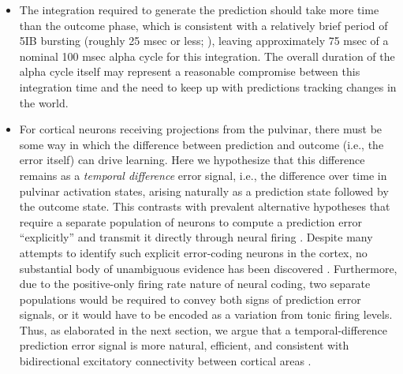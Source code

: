 \documentclass[11pt,twoside]{article}
\newif\myifpdf
\begin{document}
\begin{itemize}
		\item The integration required to generate the prediction should take more time than the outcome phase, which is consistent with a relatively brief period of 5IB bursting (roughly 25 msec or less; \citealp{ConnorsGutnickPrince82}), leaving approximately 75 msec of a nominal 100 msec alpha cycle for this integration.  The overall duration of the alpha cycle itself may represent a reasonable compromise between this integration time and the need to keep up with predictions tracking changes in the world.

	\item For cortical neurons receiving projections from the pulvinar, there must be some way in which the difference between prediction and outcome (i.e., the error itself) can drive learning.  Here we hypothesize that this difference remains as a \emph{temporal difference} error signal, i.e., the difference over time in pulvinar activation states, arising naturally as a prediction state followed by the outcome state.  This contrasts with prevalent alternative hypotheses that require a separate population of neurons to compute a prediction error ``explicitly'' and transmit it directly through neural firing \citep{RaoBallard99,KawatoHayakawaInui93,Friston05,Friston10,OudenKokLange12,LotterKreimanCox16}.  Despite many attempts to identify such explicit error-coding neurons in the cortex, no substantial body of unambiguous evidence has been discovered \citep{KokLange15,KokJeheedeLange12,SummerfieldEgner09,LeeMumford03,WalshMcGovernClarkEtAl20}.  Furthermore, due to the positive-only firing rate nature of neural coding, two separate populations would be required to convey both signs of prediction error signals, or it would have to be encoded as a variation from tonic firing levels.  Thus, as elaborated in the next section, we argue that a temporal-difference prediction error signal is more natural, efficient, and consistent with bidirectional excitatory connectivity between cortical areas \citep{RumelhartMcClelland82,Hopfield84,DesimoneDuncan95,ReynoldsChelazziDesimone99,MillerCohen01,OReillyWyatteHerdEtAl13}.  


\end{itemize}
\end{document}
